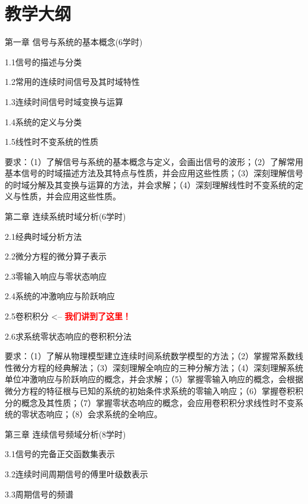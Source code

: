 \documentclass[letterpaper]{article}
\begin{document}
\section*{\textsc{教学大纲}}
第一章 \quad 信号与系统的基本概念(6学时)\par
\quad\quad 1.1信号的描述与分类\par
\quad\quad 1.2常用的连续时间信号及其时域特性\par
\quad\quad 1.3连续时间信号时域变换与运算\par
\quad\quad 1.4系统的定义与分类\par
\quad\quad 1.5线性时不变系统的性质\par
\quad\quad 要求：（1）了解信号与系统的基本概念与定义，会画出信号的波形；（2）了解常用基本信号的时域描述方法及其特点与性质，并会应用这些性质；（3）深刻理解信号的时域分解及其变换与运算的方法，并会求解；（4）深刻理解线性时不变系统的定义与性质，并会应用这些性质。\par
\vspace{1em}
第二章 \quad 连续系统时域分析(6学时)\par
\quad\quad 2.1经典时域分析方法\par
\quad\quad 2.2微分方程的微分算子表示\par
\quad\quad 2.3零输入响应与零状态响应\par
\quad\quad 2.4系统的冲激响应与阶跃响应\par
\quad\quad 2.5卷积积分 <-- \textcolor{red}{\textbf{我们讲到了这里！}}\par
\quad\quad 2.6求系统零状态响应的卷积积分法\par
\quad\quad 要求：（1）了解从物理模型建立连续时间系统数学模型的方法；（2）掌握常系数线性微分方程的经典解法；（3）深刻理解全响应的三种分解方法；（4）深刻理解系统单位冲激响应与阶跃响应的概念，并会求解；（5）掌握零输入响应的概念，会根据微分方程的特征根与已知的系统的初始条件求系统的零输入响应；（6）掌握卷积积分的概念及其性质；（7）掌握零状态响应的概念，会应用卷积积分求线性时不变系统的零状态响应；（8）会求系统的全响应。\par
\vspace{1em}
第三章 \quad 连续信号频域分析(8学时)\par
\quad\quad 3.1信号的完备正交函数集表示\par
\quad\quad 3.2连续时间周期信号的傅里叶级数表示\par
\quad\quad 3.3周期信号的频谱\par
\end{document}
